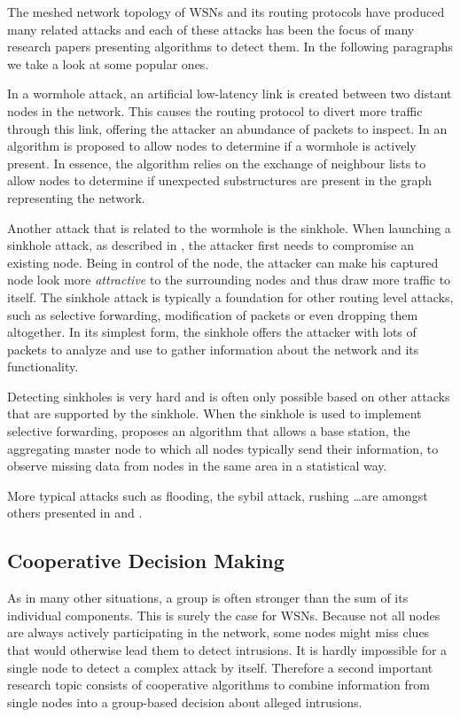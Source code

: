 \documentclass[conference]{IEEEtran}
\begin{document}
The meshed network topology of WSNs and its routing protocols have produced
many related attacks and each of these attacks has been the focus of many
research papers presenting algorithms to detect them. In the following
paragraphs we take a look at some popular ones.

In a wormhole attack, an artificial low-latency link is created between two
distant nodes in the network. This causes the routing protocol to divert more
traffic through this link, offering the attacker an abundance of packets to
inspect. In \cite{maheshwari2007detecting} an algorithm is proposed to allow
nodes to determine if a wormhole is actively present. In essence, the algorithm
relies on the exchange of neighbour lists to allow nodes to determine if
unexpected substructures are present in the graph representing the network.

Another attack that is related to the wormhole is the sinkhole. When launching
a sinkhole attack, as described in \cite{krontiris2008launching}, the attacker
first needs to compromise an existing node. Being in control of the node, the
attacker can make his captured node look more \emph{attractive} to the
surrounding nodes and thus draw more traffic to itself. The sinkhole attack is
typically a foundation for other routing level attacks, such as selective
forwarding, modification of packets or even dropping them altogether. In its
simplest form, the sinkhole offers the attacker with lots of packets to analyze
and use to gather information about the network and its functionality.

Detecting sinkholes is very hard and is often only possible based on other
attacks that are supported by the sinkhole. When the sinkhole is used to
implement selective forwarding, \cite{ngai2006intruder} proposes an algorithm
that allows a base station, the aggregating master node to which all nodes
typically send their information, to observe missing data from nodes in the
same area in a statistical way.

More typical attacks such as flooding, the sybil attack, rushing \dots are
amongst others presented in \cite{wood2002denial} and \cite{djenouri2005survey}.

\subsection{Cooperative Decision Making}
\label{subsection:coorperative}

As in many other situations, a group is often stronger than the sum of its
individual components. This is surely the case for WSNs. Because not all nodes
are always actively participating in the network, some nodes might miss clues
that would otherwise lead them to detect intrusions. It is hardly impossible
for a single node to detect a complex attack by itself. Therefore a second
important research topic consists of cooperative algorithms to combine
information from single nodes into a group-based decision about alleged
intrusions.
\end{document}
